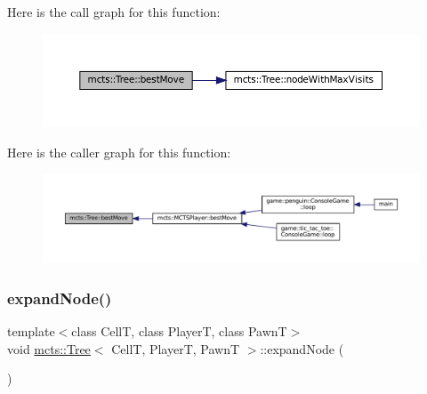 Here is the call graph for this function\+:
\nopagebreak
\begin{figure}[H]
\begin{center}
\leavevmode
\includegraphics[width=350pt]{classmcts_1_1_tree_a0431bd1074e29e682fe3c7bc6a3aee89_cgraph}
\end{center}
\end{figure}
Here is the caller graph for this function\+:
\nopagebreak
\begin{figure}[H]
\begin{center}
\leavevmode
\includegraphics[width=350pt]{classmcts_1_1_tree_a0431bd1074e29e682fe3c7bc6a3aee89_icgraph}
\end{center}
\end{figure}
\mbox{\label{classmcts_1_1_tree_a4cdd4b2dc809c29fe376dc251155d2cf}} 
\subsubsection{\texorpdfstring{expand\+Node()}{expandNode()}}
{\footnotesize\ttfamily template$<$class CellT, class PlayerT, class PawnT$>$ \\
void \hyperlink{classmcts_1_1_tree}{mcts\+::\+Tree}$<$ CellT, PlayerT, PawnT $>$\+::expand\+Node (\begin{DoxyParamCaption}{ }\end{DoxyParamCaption})\hspace{0.3cm}{\ttfamily [protected]}}

\mbox{\label{classmcts_1_1_tree_a75496cb3742583b221c1b95d8fd85718}} 

